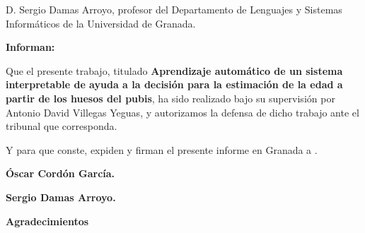 \vspace{1cm}

D. Sergio Damas Arroyo, profesor del Departamento de Lenguajes y Sistemas Informáticos de la Universidad de Granada.

\vspace{1cm}

\textbf{Informan:}

\vspace{1cm}

Que el presente trabajo, titulado \textbf{Aprendizaje automático de un sistema interpretable de ayuda a la decisión para la estimación de la edad a partir de los huesos del pubis}, ha sido realizado bajo su supervisión por Antonio David Villegas Yeguas, y autorizamos la defensa de dicho trabajo ante el tribunal que corresponda.

\vspace{1cm}

Y para que conste, expiden y firman el presente informe en Granada a \thedate.

\vspace{5cm}

\textbf{Óscar Cordón García.}

\textbf{Sergio Damas Arroyo.}

\newpage

{\Large \textbf{Agradecimientos}}
